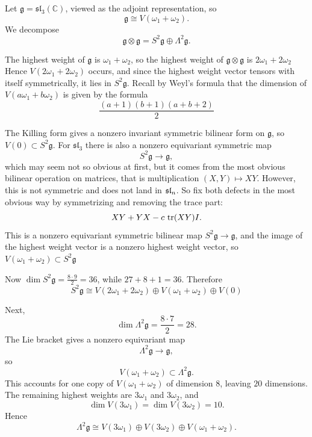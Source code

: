 \documentclass[12pt]{article}
\begin{document}
\begin{solution}
    Let $\mathfrak g=\mathfrak{sl}_3(\mathbb C)$, viewed as the adjoint representation, so
    \[
        \mathfrak g\cong V(\omega_1+\omega_2).
    \]
    We decompose
    \[
        \mathfrak g\otimes \mathfrak g = S^2\mathfrak g \oplus \Lambda^2\mathfrak g.
    \]

    The highest weight of $\mathfrak g$ is $\omega_1+\omega_2$, so the highest weight of
    $\mathfrak g\otimes\mathfrak g$ is $2\omega_1+2\omega_2$
    Hence $V(2\omega_1+2\omega_2)$ occurs, and since the highest weight vector tensors with itself symmetrically, it lies in $S^2\mathfrak g$. Recall by Weyl's formula that the dimension of $V(a\omega_1+b\omega_2)$ is given by the formula \[\frac{(a+1)(b+1)(a+b+2)}{2}\]

    The Killing form gives a nonzero invariant symmetric bilinear form on $\mathfrak g$, so $V(0)\subset S^2\mathfrak g$. For $\mathfrak{sl}_3$ there is also a nonzero equivariant symmetric map
    \[
        S^2\mathfrak g \to \mathfrak g,
    \] which may seem not so obvious at first, but it comes from
    the most obvious bilinear operation on matrices, that is multiplication $(X,Y)\mapsto XY$. However, this is not symmetric and does not land in $\sl_n$. So fix both defects in the most obvious way by symmetrizing and removing the trace part:
    \[
        XY+YX-c\,\tr(XY)I.
    \] This is a nonzero equivariant symmetric bilinear map $S^2\mathfrak g \to \mathfrak g$, and the image of the highest weight vector is a nonzero highest weight vector,
    so $V(\omega_1+\omega_2)\subset S^2\mathfrak g$

    Now
    $\dim S^2\mathfrak g=\frac{8\cdot 9}{2}=36$,
    while
    $27+8+1=36$.
    Therefore
    \[S^2\mathfrak g \cong V(2\omega_1+2\omega_2)\oplus V(\omega_1+\omega_2)\oplus V(0)\]

    Next,
    \[
        \dim \Lambda^2\mathfrak g=\frac{8\cdot 7}{2}=28.
    \]
    The Lie bracket gives a nonzero equivariant map
    \[
        \Lambda^2\mathfrak g \to \mathfrak g,
    \]
    so
    \[
        V(\omega_1+\omega_2)\subset \Lambda^2\mathfrak g.
    \]
    This accounts for one copy of $V(\omega_1+\omega_2)$ of dimension $8$, leaving $20$ dimensions. The remaining highest weights are $3\omega_1$ and $3\omega_2$, and
    \[
        \dim V(3\omega_1)=\dim V(3\omega_2)=10.
    \]
    Hence
    \[
        \Lambda^2\mathfrak g
        \cong
        V(3\omega_1)\oplus V(3\omega_2)\oplus V(\omega_1+\omega_2).
    \]


\end{solution}
\end{document}

